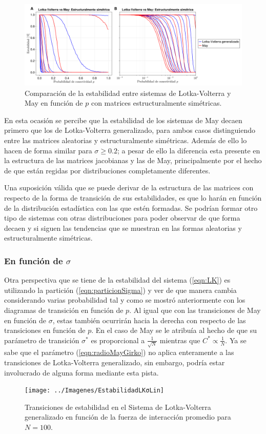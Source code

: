\begin{figure}[h!]
	\centering
	\includegraphics[scale=0.16]{../Imagenes/ComparacionLKMayESim.png}
	\caption{Comparación de la estabilidad entre sistemas de Lotka-Volterra y May en función de $p$ con matrices estructuralmente simétricas.}
	\label{fig:ComparacionLKMayESim}
\end{figure}

En esta ocasión se percibe que la estabilidad de los sistemas de May decaen primero que los de Lotka-Volterra generalizado, para ambos casos distinguiendo entre las matrices aleatorias y estructuralmente simétricas. Además de ello lo hacen de forma similar para $\sigma\geq0.2$; a pesar de ello la diferencia esta presente en la estructura de las matrices jacobianas y las de May, principalmente por el hecho de que están regidas por distribuciones completamente diferentes.

Una suposición válida que se puede derivar de la estructura de las matrices con respecto de la forma de transición de sus estabilidades, es que lo harán en función de la distribución estadística con las que estén formadas. Se podrían formar otro tipo de sistemas con otras distribuciones para poder observar de que forma decaen y si siguen las tendencias que se muestran en las formas aleatorias y estructuralmente simétricas.

\subsubsection*{En función de $\sigma$}

Otra perspectiva que se tiene de la estabilidad del sistema (\ref{eqn:LK}) es utilizando la partición (\ref{eqn:particionSigma}) y ver de que manera cambia considerando varias probabilidad tal y como se mostró anteriormente con los diagramas de transición en función de $p$. Al igual que con las transiciones de May en función de $\sigma$, estas también ocurrirán hacia la derecha con respecto de las transiciones en función de $p$. En el caso de May se le atribuía al hecho de que su parámetro de transición $\sigma^*$ es proporcional a $\frac{1}{\sqrt{N}}$ mientras que $C^*\propto\frac{1}{N}$. Ya se sabe que el parámetro (\ref{eqn:radioMayGirko}) no aplica enteramente a las transiciones de Lotka-Volterra generalizado, sin embargo, podría estar involucrado de alguna forma mediante esta pista.
\begin{figure}[h!]
	\centering
	\texttt{[image: ../Imagenes/EstabilidadLKσLin]}
	\caption{Transiciones de estabilidad en el Sistema de Lotka-Volterra generalizado en función de la fuerza de interacción promedio para $N=100$.}
	\label{fig:EstabilidadLKσLin}
\end{figure}

